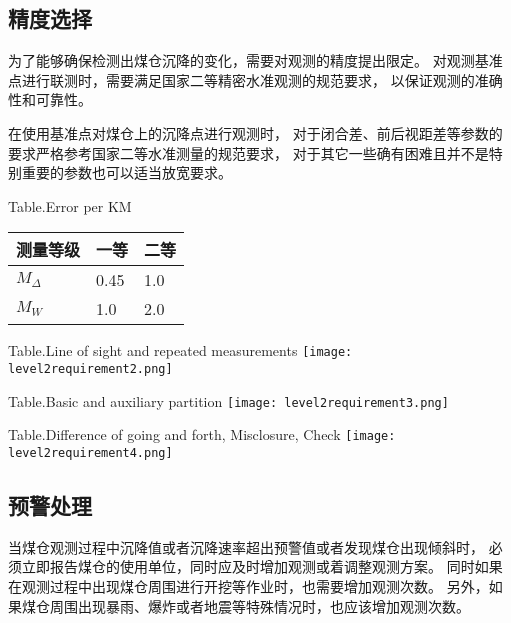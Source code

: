 \subsection{精度选择}
为了能够确保检测出煤仓沉降的变化，需要对观测的精度提出限定。
对观测基准点进行联测时，需要满足国家二等精密水准观测的规范要求，
以保证观测的准确性和可靠性。

在使用基准点对煤仓上的沉降点进行观测时，
对于闭合差、前后视距差等参数的要求严格参考国家二等水准测量的规范要求，
对于其它一些确有困难且并不是特别重要的参数也可以适当放宽要求。
\begin{table}[!htbp]
\begin{center}
			{Table.}{Error per KM}
\begin{tabularx}{15cm}{XXX}
\toprule
测量等级     &  一等     & 二等	 \\
\midrule
$M_\Delta$   &  0.45     & 1.0    \\
$M_W$     	 &  1.0      & 2.0    \\
\bottomrule
\end{tabularx}
\end{center}
\end{table}

\begin{table}[!htbp]
\begin{center}
			{Table.}{Line of sight and repeated measurements}
\texttt{[image: level2requirement2.png]}
\end{center}
\end{table}

\begin{table}[!htbp]
   \centering
			{Table.}{Basic and auxiliary partition}
   \texttt{[image: level2requirement3.png]}
\end{table}

\begin{table}[!htbp]
   \centering
			{Table.}{Difference of going and forth, Misclosure, Check}
   \texttt{[image: level2requirement4.png]}
\end{table}

\subsection{预警处理}
当煤仓观测过程中沉降值或者沉降速率超出预警值或者发现煤仓出现倾斜时，
必须立即报告煤仓的使用单位，同时应及时增加观测或着调整观测方案。
同时如果在观测过程中出现煤仓周围进行开挖等作业时，也需要增加观测次数。
另外，如果煤仓周围出现暴雨、爆炸或者地震等特殊情况时，也应该增加观测次数。


